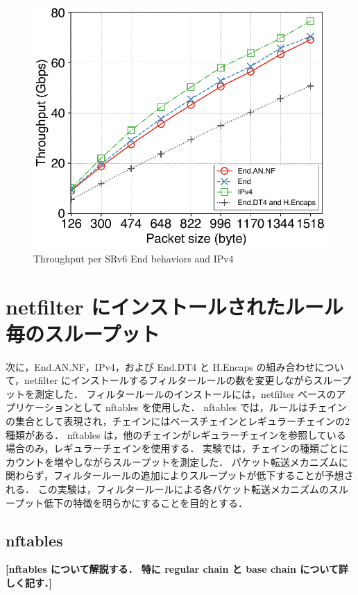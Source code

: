 \begin{figure}[t]
    \centering
    \includegraphics[width=0.95\linewidth]{img/size-throughput.pdf}
    \caption{Throughput per SRv6 End behaviors and IPv4}
    \label{fig:size-thru}
\end{figure}


\section{netfilter にインストールされたルール毎のスループット}
\label{sec:eval.thru-chains}
次に，End.AN.NF，IPv4，および End.DT4 と H.Encaps の組み合わせについて，netfilter にインストールするフィルタールールの数を変更しながらスループットを測定した．
フィルタールールのインストールには，netfilter ベースのアプリケーションとして nftables を使用した．
nftables では，ルールはチェインの集合として表現され，チェインにはベースチェインとレギュラーチェインの2種類がある．
nftables は，他のチェインがレギュラーチェインを参照している場合のみ，レギュラーチェインを使用する．
実験では，チェインの種類ごとにカウントを増やしながらスループットを測定した．
パケット転送メカニズムに関わらず，フィルタールールの追加によりスループットが低下することが予想される．
この実験は，フィルタールールによる各パケット転送メカニズムのスループット低下の特徴を明らかにすることを目的とする．

\subsection{nftables}
\label{ssec:thru-chains.nftables}
\textbf{[nftables について解説する． 特に regular chain と base chain について詳しく記す．]}


